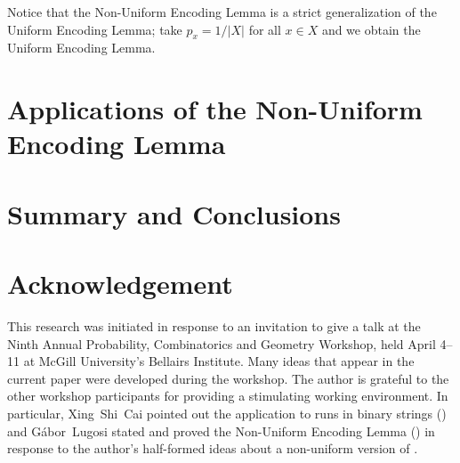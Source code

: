 \documentclass[lotsofwhite]{patmorin}
\begin{document}
Notice that the Non-Uniform Encoding Lemma is a strict generalization
of the Uniform Encoding Lemma; take $p_x=1/|X|$ for all $x\in X$
and we obtain the Uniform Encoding Lemma.

\section{Applications of the Non-Uniform Encoding Lemma}


\section{Summary and Conclusions}


\section*{Acknowledgement}

This research was initiated in response to an invitation to give
a talk at the Ninth Annual Probability, Combinatorics and Geometry
Workshop, held April 4--11 at McGill University's Bellairs Institute.
Many ideas that appear in the current paper were developed during the
workshop. The author is grateful to the other workshop participants for
providing a stimulating working environment.  In particular, Xing~Shi~Cai
pointed out the application to runs in binary strings ()
and G\'abor~Lugosi stated and proved the Non-Uniform Encoding Lemma
() in response to the author's half-formed ideas about a
non-uniform version of .



\end{document}
